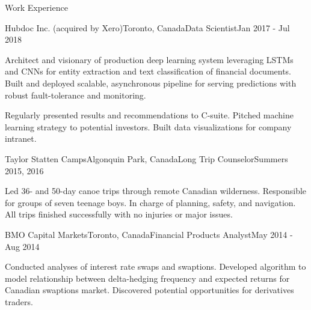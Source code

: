 \documentclass{resume} %
\begin{document}
\begin{rSection}{Work Experience}
\begin{rSubsection}{Hubdoc Inc. (acquired by Xero)}{Toronto, Canada}{Data Scientist}{Jan 2017 - Jul 2018}
\item
    Architect and visionary of production deep learning system leveraging LSTMs and CNNs for entity extraction and text classification of financial documents.
    Built and deployed scalable, asynchronous pipeline for serving predictions with robust fault-tolerance and monitoring.

\item
    Regularly presented results and recommendations to C-suite.
    Pitched machine learning strategy to potential investors.
    Built data visualizations for company intranet.
    
\end{rSubsection}


\begin{rSubsection}{Taylor Statten Camps}{Algonquin Park, Canada}{Long Trip Counselor}{Summers 2015, 2016}

\item
    Led 36- and 50-day canoe trips through remote Canadian wilderness. Responsible for groups of seven teenage boys. In charge of planning, 
    safety, and navigation. All trips finished successfully with no injuries or major issues.

\end{rSubsection}


\begin{rSubsection}{BMO Capital Markets}{Toronto, Canada}{Financial Products Analyst}{May 2014 - Aug 2014}

\item
    Conducted analyses of interest rate swaps and swaptions.
    Developed algorithm to model relationship between delta-hedging frequency and expected returns for Canadian swaptions market.
    Discovered potential opportunities for derivatives traders.

\end{rSubsection}


\end{rSection}

\end{document}

